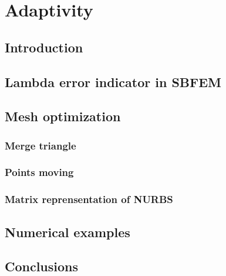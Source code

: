 
\chapter{Adaptivity}

\section{Introduction}

\section{Lambda error indicator in SBFEM}

\section{Mesh optimization}

\subsection{Merge triangle}
\subsection{Points moving}
\subsection{Matrix reprensentation of NURBS}


\section{Numerical examples}

\section{Conclusions}

